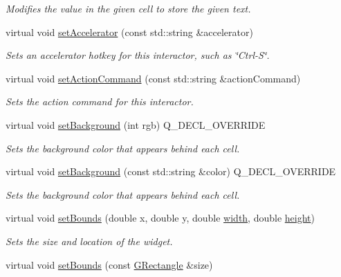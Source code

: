 \begin{DoxyCompactItemize}
\begin{DoxyCompactList}\small\item\em Modifies the value in the given cell to store the given text. \end{DoxyCompactList}\item 
virtual void \mbox{\hyperlink{classGInteractor_ad15f102f62e2960576012f1aa0ba4b2e}{set\+Accelerator}} (const std\+::string \&accelerator)
\begin{DoxyCompactList}\small\item\em Sets an accelerator hotkey for this interactor, such as \char`\"{}\+Ctrl-\/\+S\char`\"{}. \end{DoxyCompactList}\item 
virtual void \mbox{\hyperlink{classGInteractor_a4b5843fe3030e038a1ba54cc03389bcf}{set\+Action\+Command}} (const std\+::string \&action\+Command)
\begin{DoxyCompactList}\small\item\em Sets the action command for this interactor. \end{DoxyCompactList}\item 
virtual void \mbox{\hyperlink{classGTable_ac45b8a90f31752385a98a034a58547c7}{set\+Background}} (int rgb) Q\+\_\+\+D\+E\+C\+L\+\_\+\+O\+V\+E\+R\+R\+I\+DE
\begin{DoxyCompactList}\small\item\em Sets the background color that appears behind each cell. \end{DoxyCompactList}\item 
virtual void \mbox{\hyperlink{classGTable_a222fcfb542aa6094c7e0de671bd69627}{set\+Background}} (const std\+::string \&color) Q\+\_\+\+D\+E\+C\+L\+\_\+\+O\+V\+E\+R\+R\+I\+DE
\begin{DoxyCompactList}\small\item\em Sets the background color that appears behind each cell. \end{DoxyCompactList}\item 
virtual void \mbox{\hyperlink{classGInteractor_a2aae8197624b72265ab83b4f1bc73f2f}{set\+Bounds}} (double x, double y, double \mbox{\hyperlink{classGTable_ad72663daf610f2a0833a2fc3d78e4fdf}{width}}, double \mbox{\hyperlink{classGTable_ad3774f6419003470f54fd495124ef51f}{height}})
\begin{DoxyCompactList}\small\item\em Sets the size and location of the widget. \end{DoxyCompactList}\item 
virtual void \mbox{\hyperlink{classGInteractor_acada386653f008cacc7cce86426bef7c}{set\+Bounds}} (const \mbox{\hyperlink{classGRectangle}{G\+Rectangle}} \&size)

\end{DoxyCompactItemize}
